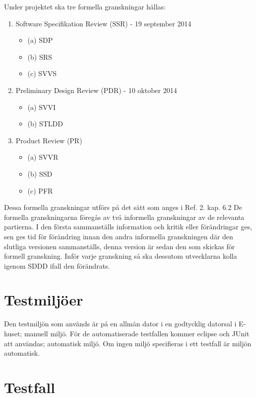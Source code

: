 \documentclass[a4paper]{article}
\begin{document}
Under projektet ska tre formella granskningar hållas:

\begin{enumerate}


\item Software Specifikation Review (SSR) - 19 september 2014
\begin{itemize}
\item [](a) SDP
\item [](b) SRS
\item [](c) SVVS
\end{itemize}


\item Preliminary Design Review (PDR) - 10 oktober 2014
\begin{itemize}
\item [](a) SVVI
\item [](b) STLDD
\end{itemize}


\item Product Review (PR)
\begin{itemize}
\item [](a) SVVR
\item [](b) SSD
\item [](c) PFR
\end{itemize}


\end{enumerate}

Dessa formella granskningar utförs på det sätt som anges i Ref. 2. kap. 6.2 De formella granskningarna föregås av två informella granskningar av de relevanta partierna. I den första sammanställs information och kritik eller förändringar ges, sen ges tid för förändring innan den andra informella granskningen där den slutliga versionen sammanställs, denna version är sedan den som skickas för formell granskning. Inför varje granskning så ska dessutom utvecklarna kolla igenom SDDD ifall den förändrats.


\section{Testmiljöer}

Den testmiljön som används är på en allmän dator i en godtycklig datorsal i E-huset; 
manuell miljö. För de automatiserade testfallen kommer eclipse och JUnit att användas;
automatisk miljö. Om ingen miljö specifieras i ett testfall är miljön automatisk.

\section{Testfall}
\end{document}
